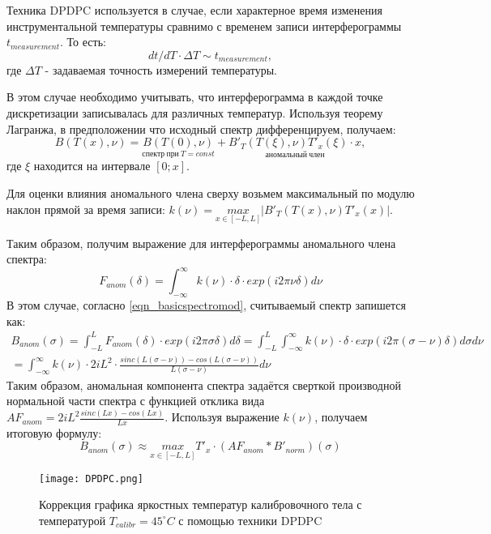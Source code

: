 \documentclass{mipt-thesis-bs}
\begin{document}
	Техника DPDPC используется в случае, если характерное время изменения инструментальной температуры сравнимо с временем записи интерферограммы $t_{measurement}$. То есть:
	$$dt/dT \cdot \Delta T \sim t_{measurement},$$
	 где $\Delta T$ - задаваемая точность измерений температуры. 
	
	В этом случае необходимо учитывать, что интерферограмма в каждой точке дискретизации записывалась для различных температур. Используя теорему Лагранжа, в предположении что исходный спектр дифференцируем, получаем:
	$$ B(T(x),\nu)=\underset{спектр\ при\ T=const}{B(T(0),\nu)}+\underset{аномальный\ член}{B'_T(T(\xi),\nu)T'_x(\xi) \cdot x},$$
	где $\xi$ находится на интервале \(\left[0;x\right]\).
	
	Для оценки влияния аномального члена сверху возьмем максимальный по модулю наклон прямой за время записи: $k(\nu)= \underset{x \in [-L,L]}{max} \left| B'_T(T(x),\nu)T'_x(x) \right| $.
	
	Таким образом, получим выражение для интерферограммы аномального члена спектра:
	\begin{equation}
		F_{anom}(\delta)=  \int^{\infty}_{-\infty} k(\nu)\cdot \delta \cdot exp(i 2 \pi \nu \delta) d\nu
	\end{equation}
	В этом случае, согласно \eqref{eqn_basicspectromod}, считываемый спектр запишется как:
	\begin{equation}
		\begin{split}
			B_{anom}(\sigma) = \int^{L}_{-L} F_{anom}(\delta) \cdot exp(i 2 \pi \sigma \delta) d\delta =  \int^{L}_{-L}\int^{\infty}_{-\infty} k(\nu)\cdot \delta \cdot exp(i 2 \pi (\sigma-\nu) \delta) d\sigma d\nu \\ = \int^{\infty}_{-\infty} k(\nu)  \cdot 2iL^2 \cdot \frac{sinc(L(\sigma-\nu))-cos(L(\sigma-\nu))}{L(\sigma-\nu)} d\nu
		\end{split}
	\end{equation}
 Таким образом, аномальная компонента спектра задаётся сверткой производной нормальной части спектра с функцией отклика вида $AF_{anom}=2iL^2\frac{sinc(Lx)-cos(Lx)}{Lx}$. Используя выражение $k(\nu)$, получаем итоговую формулу:
\begin{equation}
	B_{anom} (\sigma) \approx \underset{x \in [-L,L]}{max}T'_x \cdot (AF_{anom} \ast B'_{norm})(\sigma) 
\end{equation}
  
  	\begin{figure}[h]
  	\centering
  	\texttt{[image: DPDPC.png]}
  	\caption{Коррекция графика яркостных температур калибровочного тела с температурой $T_{calibr}=45^\circ C$ с помощью техники DPDPC}
  	\label{fig_tempcorr}
  \end{figure}
  
\end{document}

